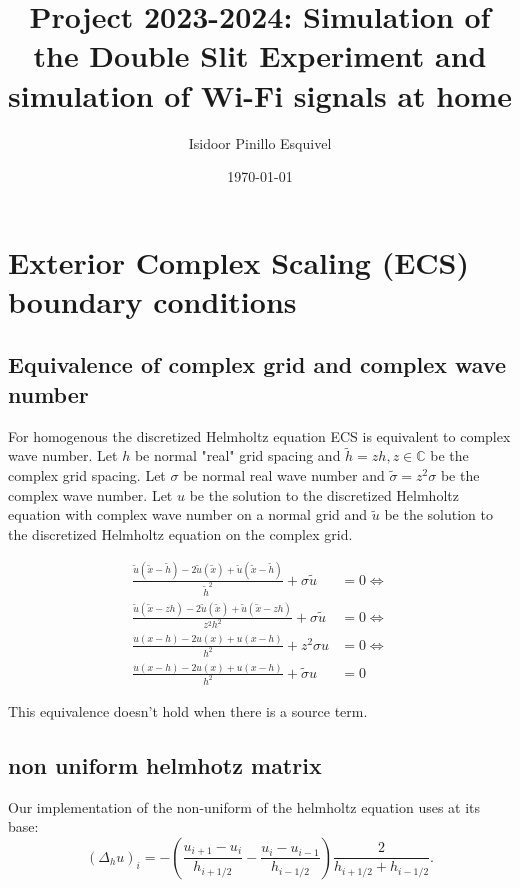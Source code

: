 \documentclass[a4paper,12pt]{article}
\begin{document}
\title{Project 2023-2024: Simulation of the Double Slit Experiment
    and simulation of Wi-Fi signals at home}
\author{Isidoor Pinillo Esquivel}
\date{\today}
\maketitle


\section{Exterior Complex Scaling (ECS) boundary conditions}
\subsection{Equivalence of complex grid and complex wave number}

For homogenous the discretized Helmholtz equation ECS is equivalent to
complex wave number. Let $h$ be normal "real" grid spacing and $\tilde{h} = z h, z \in \mathbb{C} $
be the complex grid spacing.
Let $\sigma$ be normal real wave number and $\tilde{\sigma} = z^{2} \sigma$ be the complex wave number.
Let $u$ be the solution to the discretized Helmholtz equation with complex wave number on a normal grid
and $\tilde{u}$ be the solution to the discretized Helmholtz equation on the complex grid.

\begin{align}
    \frac{\tilde{u}(\tilde{x}-\tilde{h}) -2 \tilde{u}(\tilde{x}) + \tilde{u}(\tilde{x} - \tilde{h})}{\tilde{h}^2} + \sigma \tilde{u} & = 0  \Leftrightarrow \\
    \frac{\tilde{u}(\tilde{x}-zh) -2 \tilde{u}(\tilde{x}) + \tilde{u}(\tilde{x} - zh)}{z^{2}h^2} + \sigma \tilde{u}                  & = 0  \Leftrightarrow \\
    \frac{u(x-h) -2 u(x) + u(x - h)}{h^2} + z^{2} \sigma u                                                                           & = 0  \Leftrightarrow \\
    \frac{u(x-h) -2 u(x) + u(x - h)}{h^2} + \tilde{\sigma} u                                                                         & = 0
\end{align}

This equivalence doesn't hold when there is a source term.

\subsection{ non uniform helmhotz matrix}
Our implementation of the non-uniform of the helmholtz equation uses at its base:
$$
    (\Delta_{h}u)_{i} = -\left( \frac{u_{i+1} - u_{i}}{h_{i+1/2}} - \frac{u_{i} - u_{i-1}}{h_{i-1/2}} \right) \frac{2}{h_{i+1/2} +h_{i-1/2}}
    .
$$
\end{document}
